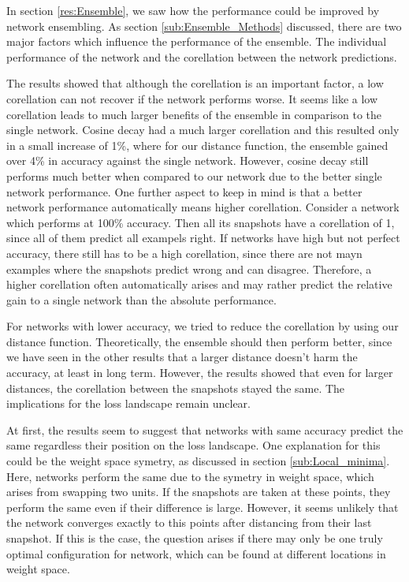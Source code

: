 In section \ref{res:Ensemble}, we saw how the performance could be improved by
network ensembling. As section \ref{sub:Ensemble_Methods} discussed, there are
two major factors which influence the performance of the ensemble. The
individual performance of the network and the corellation between the network
predictions.

The results showed that although the corellation is an important factor, a low
corellation can not recover if the network performs worse. It seems like a low
corellation leads to much larger benefits of the ensemble in comparison to the
single network. Cosine decay had a much larger corellation and this resulted
only in a small increase of 1\%, where for our distance function, the
ensemble gained over 4\% in accuracy against the single network. However, cosine
decay still performs much better when compared to our network due to the better
single network performance. One further aspect to keep in mind is that a better
network performance automatically means higher corellation. Consider a network
which performs at 100\% accuracy. Then all its snapshots have a corellation of
1, since all of them predict all exampels right. If networks have high but not
perfect accuracy, there still has to be a high corellation, since there are not
mayn examples where the snapshots predict wrong and can disagree. Therefore, a
higher corellation often automatically arises and may rather predict the
relative gain to a single network than the absolute performance.

For networks with lower accuracy, we tried to reduce the corellation by using
our distance function. Theoretically, the ensemble should then perform better,
since we have seen in the other results that a larger distance doesn't harm the
accuracy, at least in long term. However, the results showed that even for
larger distances, the corellation between the snapshots stayed the same. The
implications for the loss landscape remain unclear.

At first, the results seem to suggest that networks with same accuracy predict
the same regardless their position on the loss landscape. One explanation for
this could be the weight space symetry, as discussed in section
\ref{sub:Local_minima}. Here, networks perform the same due to the symetry in
weight space, which arises from swapping two units. If the snapshots are taken
at these points, they perform the same even if their difference is large.
However, it seems unlikely that the network converges exactly to this points
after distancing from their last snapshot. If this is the case, the question
arises if there may only be one truly optimal configuration for network, which
can be found at different locations in weight space.

